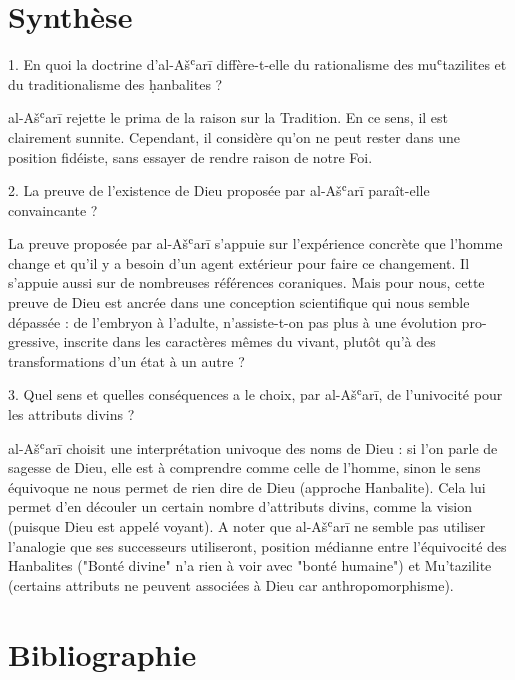 \section{Synthèse}

  1. En quoi la doctrine d’al-Ašʿarī diffère-t-elle du rationalisme des muʿtazilites et du traditionalisme des ḥanbalites ?  
  \begin{Synthesis}
  
  al-Ašʿarī rejette le prima de la raison sur la Tradition. En ce sens, il est clairement sunnite. Cependant, il considère qu'on ne peut rester dans une position fidéiste, sans essayer de rendre raison de notre Foi. 
  \end{Synthesis}
  
  2. La preuve de l’existence de Dieu proposée par al-Ašʿarī paraît-elle convaincante ?  \begin{Synthesis}
 La preuve proposée par al-Ašʿarī s'appuie sur l'expérience concrète que l'homme change et qu'il y a besoin d'un agent extérieur pour faire ce changement. Il s'appuie aussi sur de nombreuses références coraniques. Mais pour nous, cette preuve de Dieu est ancrée dans une conception scientifique qui nous semble
dépassée : de l’embryon à l’adulte, n’assiste-t-on pas plus à une évolution pro-
gressive, inscrite dans les caractères mêmes du vivant, plutôt qu’à des transformations d’un état à un autre ? 
 
  \end{Synthesis}
  
  3. Quel sens et quelles conséquences a le choix, par al-Ašʿarī, de l’univocité pour les attributs divins ? 
  
  \begin{Synthesis}
  al-Ašʿarī choisit une interprétation univoque des noms de Dieu : si l'on parle de sagesse de Dieu, elle est à comprendre comme celle de l'homme, sinon le sens équivoque ne nous permet de rien dire de Dieu (approche Hanbalite). Cela lui permet d'en découler un certain nombre d'attributs divins, comme la vision (puisque Dieu est appelé voyant).
  A noter que al-Ašʿarī ne semble pas utiliser l'analogie que ses successeurs utiliseront, position médianne entre l'équivocité des Hanbalites ("Bonté divine" n'a rien à voir avec "bonté humaine") et Mu'tazilite (certains attributs ne peuvent associées à Dieu car anthropomorphisme).
  \end{Synthesis}
  
  
  \section{Bibliographie}
